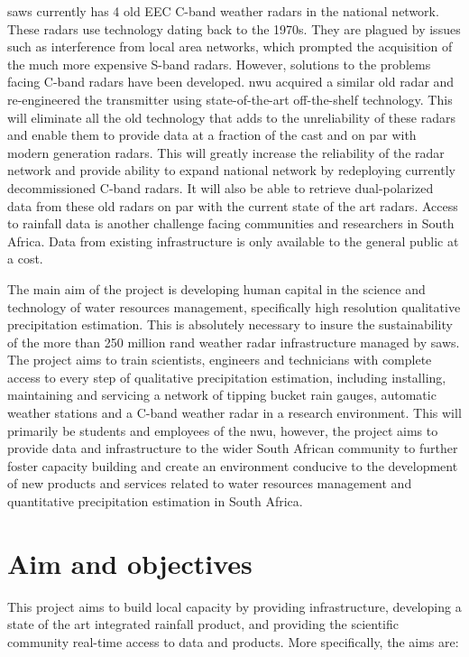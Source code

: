 \documentclass{wrcreport}
\begin{document}
\gls{saws} currently has 4 old EEC C-band weather radars in the
national network. These radars use technology dating back to the
1970s. They are plagued by issues such as interference from local area
networks, which prompted the acquisition of the much more expensive
S-band radars. However, solutions to the problems facing C-band
radars have been developed. \gls{nwu} acquired a similar old radar and
re-engineered the transmitter using state-of-the-art off-the-shelf
technology. This will eliminate all the old technology that adds to
the unreliability of these radars and enable them to provide data at a
fraction of the cast and on par with modern generation radars. This
will greatly increase the reliability of the radar network and provide
ability to expand national network by redeploying currently
decommissioned C-band radars. It will also be able to retrieve
dual-polarized data from these old radars on par with the current
state of the art radars. Access to rainfall data is another challenge
facing communities and researchers in South Africa. Data from existing
infrastructure is only available to the general public at a cost.

The main aim of the project is developing human capital in the science
and technology of water resources management, specifically high
resolution qualitative precipitation estimation. This is absolutely
necessary to insure the sustainability of the more than 250 million
rand weather radar infrastructure managed by \gls{saws}. The project
aims to train scientists, engineers and technicians with complete
access to every step of qualitative precipitation estimation,
including installing, maintaining and servicing a network of tipping
bucket rain gauges, automatic weather stations and a C-band weather
radar in a research environment. This will primarily be students and
employees of the \gls{nwu}, however, the project aims to provide data
and infrastructure to the wider South African community to further
foster capacity building and create an environment conducive to the
development of new products and services related to water resources
management and quantitative precipitation estimation in South Africa. 

\section{Aim and objectives}
\label{sec:obj}

This project aims to build local capacity by providing infrastructure,
developing a state of the art integrated rainfall product, and
providing the scientific community real-time access to data and
products. More specifically, the aims are:
\end{document}
